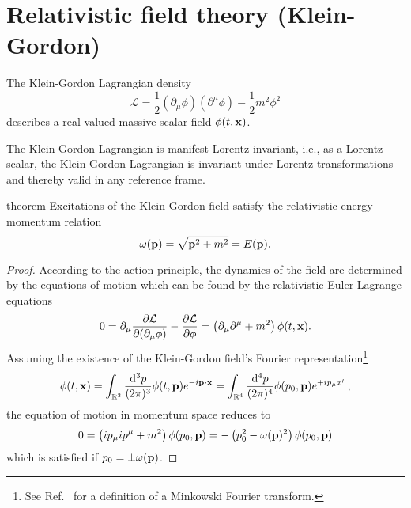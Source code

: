 \section{Relativistic field theory (Klein-Gordon)}

\begin{definition}
	The Klein-Gordon Lagrangian density
	\begin{equation}
		\mathcal{L}
		=
		\frac{1}{2}
		\left(\partial_\mu\phi\right)
		\left(\partial^\mu\phi\right)
		-
		\frac{1}{2}
		m^2\phi^2
		\label{eq:kg_lagrangian}
	\end{equation}
	describes a real-valued massive scalar field $\phi(t,\vb{x})$.
\end{definition}

The Klein-Gordon Lagrangian is manifest Lorentz-invariant, i.e., as a Lorentz scalar, the Klein-Gordon Lagrangian is invariant under Lorentz transformations and thereby valid in any reference frame.
\begin{theorem}{theorem}\label{th:relativistic_energy_momentum}
	Excitations of the Klein-Gordon field satisfy the relativistic energy-momentum relation
	\begin{equation}
		\omega(\vb{p})
		=
		\sqrt{\vb{p}^2+m^2}
		=
		E(\vb{p})
		\label{eq:energy_momentum_relation}
		.
	\end{equation}
\end{theorem}
\begin{proof}
	According to the action principle, the dynamics of the field are determined by the equations of motion which can be found by the relativistic Euler-Lagrange equations
	\begin{equation*}
		0
		=
		\partial_\mu\pdv{\mathcal{L}}{(\partial_\mu\phi)}
		-
		\pdv{\mathcal{L}}{\phi}
		=
		\left(
			\partial_\mu\partial^\mu
			+
			m^2
		\right)
		\phi(t,\vb{x})
		.
	\end{equation*}
	Assuming the existence of the Klein-Gordon field's Fourier representation\footnote{See Ref.~\cite[p.~341]{Cohen2019} for a definition of a Minkowski Fourier transform.}
	\begin{equation*}
		\phi(t,\vb{x})
		=
		\int_{\mathbb{R}^3}\frac{\dd[3]{p}}{(2\pi)^3}
		\phi(t,\vb{p})
		e^{-i\vb{p}\vdot\vb{x}}
		=
		\int_{\mathbb{R}^4}\frac{\dd[4]{p}}{(2\pi)^4}
		\phi(p_0,\vb{p})
		e^{+ip_\mu x^\mu}
		,
	\end{equation*}
	the equation of motion in momentum space reduces to
	\begin{equation*}
		0
		=
		\left(
			ip_\mu ip^\mu
			+
			m^2
		\right)
		\phi(p_0,\vb{p})
		=
		-
		\left(
			p_0^2
			-
			\omega(\vb{p})^2
		\right)
		\phi(p_0,\vb{p})
	\end{equation*}
	which is satisfied if $p_0=\pm\omega(\vb{p})$.
\end{proof}

